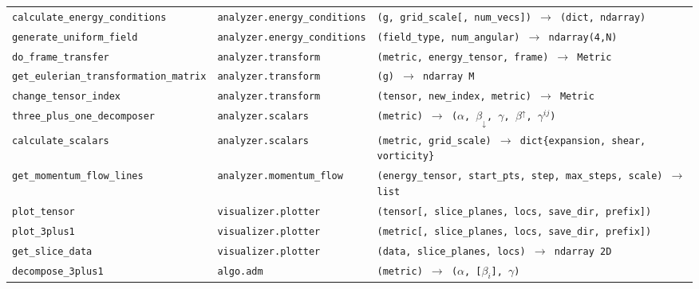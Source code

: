 \documentclass[11pt, a4paper, twoside]{report}
\begin{document}
\begin{longtable}{p{4.5cm} p{3.0cm} p{6.8cm}}
  \texttt{calculate\_energy\_conditions}
  & \texttt{analyzer.energy\_conditions}
  & \texttt{(g, grid\_scale[, num\_vecs]) $\to$ (dict, ndarray)} \\[0.3em]

  \texttt{generate\_uniform\_field}
  & \texttt{analyzer.energy\_conditions}
  & \texttt{(field\_type, num\_angular) $\to$ ndarray(4,N)} \\[0.3em]

  \texttt{do\_frame\_transfer}
  & \texttt{analyzer.transform}
  & \texttt{(metric, energy\_tensor, frame) $\to$ Metric} \\[0.3em]

  \texttt{get\_eulerian\_transformation\_matrix}
  & \texttt{analyzer.transform}
  & \texttt{(g) $\to$ ndarray M} \\[0.3em]

  \texttt{change\_tensor\_index}
  & \texttt{analyzer.transform}
  & \texttt{(tensor, new\_index, metric) $\to$ Metric} \\[0.3em]

  \texttt{three\_plus\_one\_decomposer}
  & \texttt{analyzer.scalars}
  & \texttt{(metric) $\to$ ($\alpha$, $\beta_\downarrow$, $\gamma$, $\beta^\uparrow$, $\gamma^{ij}$)} \\[0.3em]

  \texttt{calculate\_scalars}
  & \texttt{analyzer.scalars}
  & \texttt{(metric, grid\_scale) $\to$ dict\{expansion, shear, vorticity\}} \\[0.3em]

  \texttt{get\_momentum\_flow\_lines}
  & \texttt{analyzer.momentum\_flow}
  & \texttt{(energy\_tensor, start\_pts, step, max\_steps, scale) $\to$ list} \\[0.3em]

  \texttt{plot\_tensor}
  & \texttt{visualizer.plotter}
  & \texttt{(tensor[, slice\_planes, locs, save\_dir, prefix])} \\[0.3em]

  \texttt{plot\_3plus1}
  & \texttt{visualizer.plotter}
  & \texttt{(metric[, slice\_planes, locs, save\_dir, prefix])} \\[0.3em]

  \texttt{get\_slice\_data}
  & \texttt{visualizer.plotter}
  & \texttt{(data, slice\_planes, locs) $\to$ ndarray 2D} \\[0.3em]

  \texttt{decompose\_3plus1}
  & \texttt{algo.adm}
  & \texttt{(metric) $\to$ ($\alpha$, [$\beta_i$], $\gamma$)} \\[0.3em]


\end{longtable}
\end{document}
